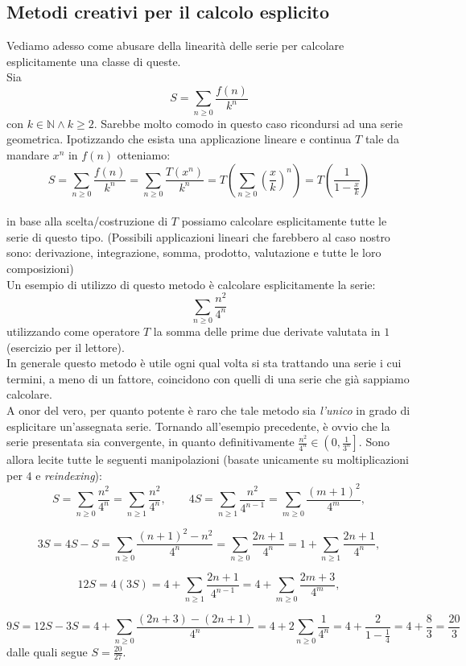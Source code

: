 \documentclass[a4paper,twoside]{article}
\newcommand{\N}{\mathbb{N}}
\theoremstyle{definition}
\numberwithin{theorem}{section}
\begin{document}
\subsection{Metodi creativi per il calcolo esplicito}
Vediamo adesso come abusare della linearità delle serie per calcolare esplicitamente una classe di queste. \\
Sia
$$S=\sum_{n\geq 0}^{}\frac{f(n)}{k^n}$$
con $k\in\N \wedge k\geq 2$.
Sarebbe molto comodo in questo caso ricondursi ad una serie geometrica.
Ipotizzando che esista una applicazione lineare e continua $T$ tale da mandare $x^n$ in $f(n)$ otteniamo:
$$S=\sum_{n\geq 0}\frac{f(n)}{k^n}=\sum_{n\geq 0}\frac{T(x^n)}{k^n}= T\left(  \sum_{n\geq 0}\left(\frac{x}{k}\right)^n \right)= T \left(\frac{1}{1-\frac{x}{k}}\right)$$ \\
in base alla scelta/costruzione di $T$ possiamo calcolare esplicitamente tutte le serie di questo tipo.
(Possibili applicazioni lineari che farebbero al caso nostro sono: derivazione, integrazione, somma, prodotto, valutazione e tutte le loro composizioni)\\
Un esempio di utilizzo di questo metodo è calcolare esplicitamente la serie:
$$\sum_{n\geq 0}^{}\frac{n^2}{4^n}$$
utilizzando come operatore $T$ la somma delle prime due derivate valutata in $1$ (esercizio per il lettore).\\
In generale questo metodo è utile ogni qual volta si sta trattando una serie i cui termini, a meno di un fattore, coincidono con quelli di una serie che già sappiamo calcolare.\\
A onor del vero, per quanto potente è raro che tale metodo sia \emph{l'unico} in grado di esplicitare un'assegnata serie. 
Tornando all'esempio precedente, è ovvio che la serie presentata sia convergente, in quanto definitivamente $\frac{n^2}{4^n}\in\left(0,\frac{1}{3^n}\right]$. 
Sono allora lecite tutte le seguenti manipolazioni (basate unicamente su moltiplicazioni per $4$ e \emph{reindexing}):
$$ S=\sum_{n\geq 0}\frac{n^2}{4^n}=\sum_{n\geq 1}\frac{n^2}{4^n},\qquad 4S=\sum_{n\geq 1}\frac{n^2}{4^{n-1}}=\sum_{m\geq 0}\frac{(m+1)^2}{4^m}, $$

$$ 3S=4S-S = \sum_{n\geq 0}\frac{(n+1)^2-n^2}{4^n}=\sum_{n\geq 0}\frac{2n+1}{4^n}=1+\sum_{n\geq 1}\frac{2n+1}{4^n},$$

$$ 12S=4(3S) = 4+\sum_{n\geq 1}\frac{2n+1}{4^{n-1}} = 4+\sum_{m\geq 0}\frac{2m+3}{4^m}, $$

$$ 9S = 12S-3S = 4+\sum_{n\geq 0}\frac{(2n+3)-(2n+1)}{4^n} = 4+2\sum_{n\geq 0}\frac{1}{4^n} = 4+\frac{2}{1-\frac{1}{4}} = 4+\frac{8}{3} = \frac{20}{3} $$
dalle quali segue $S=\frac{20}{27}$.
\end{document}
